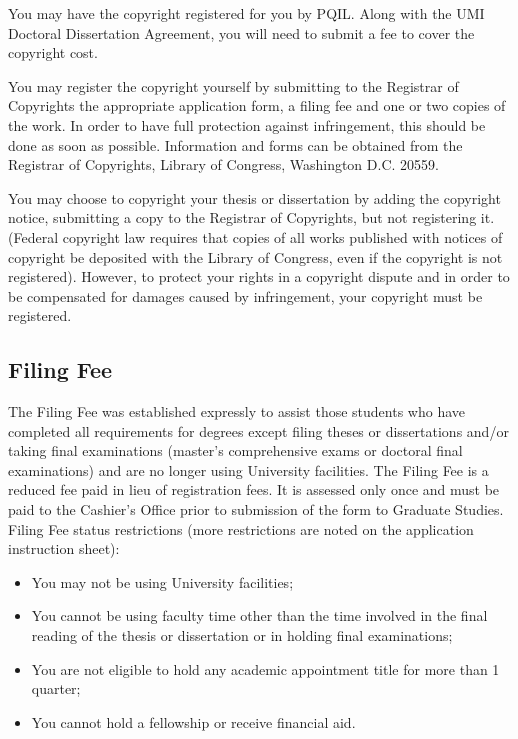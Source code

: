 You may have the copyright registered for you by PQIL. Along with the UMI Doctoral Dissertation Agreement, you will need to submit a fee to cover the copyright cost.

You may register the copyright yourself by submitting to the Registrar of Copyrights the appropriate application form, a filing fee and one or two copies of the work. In order to have full protection against infringement, this should be done as soon as possible. Information and forms can be obtained from the Registrar of Copyrights, Library of Congress, Washington D.C. 20559.

You may choose to copyright your thesis or dissertation by adding the copyright notice, submitting a copy to the Registrar of Copyrights, but not registering it. (Federal copyright law requires that copies of all works published with notices of copyright be deposited with the Library of Congress, even if the copyright is not registered). However, to protect your rights in a copyright dispute and in order to be compensated for damages caused by infringement, your copyright must be registered.

\subsection{Filing Fee}
%
The Filing Fee was established expressly to assist those students who have completed all requirements for degrees except filing theses or dissertations and/or taking final examinations (master's comprehensive exams or doctoral final examinations) and are no longer using University facilities. The Filing Fee is a reduced fee paid in lieu of registration fees. It is assessed only once and must be paid to the Cashier's Office prior to submission of the form to Graduate Studies. Filing Fee status restrictions (more restrictions are noted on the application instruction sheet):
%
\begin{itemize}
  \item You may not be using University facilities;
  \item You cannot be using faculty time other than the time involved in the final reading of the thesis or dissertation or in holding final examinations;
  \item You are not eligible to hold any academic appointment title for more than 1 quarter;
  \item You cannot hold a fellowship or receive financial aid.
\end{itemize}

